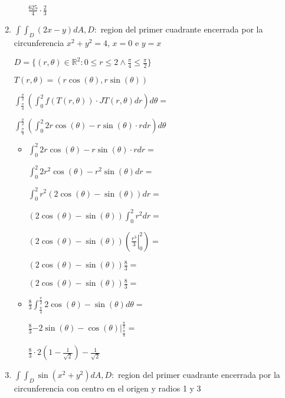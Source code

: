 \documentclass[../practica_09.tex]{subfiles}
\begin{document}
\begin{enumerate}
\begin{itemize}
                    $ \frac{625}{4} \cdot \frac{2}{3}  $

            \end{itemize}

        \item $\int\int_D (2x-y) dA, D:$ region del primer cuadrante encerrada por la circunferencia $x^2 + y^2 = 4$, $x = 0$ e $y=x$
        
            $D = \{(r,\theta) \in \mathbb{R}^2: 0\leq r \leq 2 \wedge \frac{\pi}{4} \leq \frac{\pi}{2}\}$  

            $T(r,\theta) = (r\cos(\theta),r\sin(\theta))$

            $ \int_{\frac{\pi}{4}}^{\frac{\pi}{2}} ( \int_0^2 f(T(r,\theta)) \cdot JT(r,\theta) dr ) d\theta = $

            $ \int_{\frac{\pi}{4}}^{\frac{\pi}{2}} ( \int_0^2 2r\cos(\theta) - r\sin(\theta) \cdot r dr ) d\theta $

            \begin{itemize}
                \item $\int_0^2 2r\cos(\theta) - r\sin(\theta) \cdot r dr = $
                
                    $\int_0^2 2r^2\cos(\theta) - r^2\sin(\theta) dr = $

                    $\int_0^2 r^2(2\cos(\theta) - \sin(\theta)) dr = $

                    $(2\cos(\theta) - \sin(\theta)) \int_0^2 r^2 dr = $

                    $(2\cos(\theta) - \sin(\theta)) (\left. \frac{r^3}{3}\right |_0^2 )= $

                    $(2\cos(\theta) - \sin(\theta)) \frac{8}{3} = $

                    $(2\cos(\theta) - \sin(\theta)) \frac{8}{3} = $

                \item $\frac{8}{3} \int_{\frac{\pi}{4}}^{\frac{\pi}{2}} 2\cos(\theta) - \sin(\theta) d\theta = $
                
                    $\frac{8}{3} \left. -2\sin(\theta) - \cos(\theta) \right |_{\frac{\pi}{4}}^{\frac{\pi}{2}} = $

                    $\frac{8}{3} \cdot 2\left(1-\frac{1}{\sqrt{2}}\right)-\frac{1}{\sqrt{2}} $

            \end{itemize}


        \item $\int\int_D \sin(x^2+y^2) dA, D:$ region del primer cuadrante encerrada por la circunferencia con centro en el origen y radios 1 y 3
        

\end{enumerate}
\end{document}
